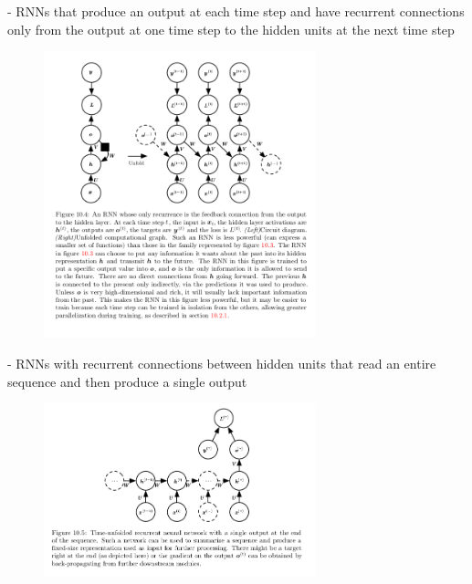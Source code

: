 \documentclass[onecolumn, letterpaper, 12pt]{report}
\begin{document}
- RNNs that produce an output at each time step and have recurrent connections only from the output at one time step to the hidden units at the next time step 

\begin{figure}[h]
  \centering
  \includegraphics[width=0.7\textwidth]{rnn_dp_2.png}
\end{figure}

- RNNs with recurrent connections between hidden units that read an entire sequence and then produce a single output 

\begin{figure}[h]
  \centering
  \includegraphics[width=0.7\textwidth]{rnn_dp_3.png}
\end{figure}
\end{document}
